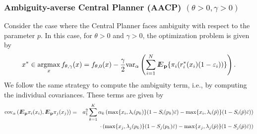 \subsubsection{Ambiguity-averse Central Planner (AACP) $(\theta>0,\gamma>0)$}
Consider the case where the Central Planner faces ambiguity with respect to the parameter $p$.  In this case, for $\theta>0$ and $\gamma>0$, the optimization problem is given by
\begin{equation}\label{eq:aacp}
x^*\in\mathop{\rm argmax}_{x}  f_{\theta,\gamma}(x)= f_{\theta,0}(x) - \frac{\gamma}{2}{\mathop{\rm var}\nolimits}_{\alpha} \left(\sum_{i=1}^N {I\kern-.35em E}_{\bf p}\{\pi_i(r^*_i(x_i)(1-\varepsilon_i))\}\right).
\end{equation}
We follow the same strategy to compute the ambiguity term, i.e., by computing the individual covariances.  These terms are given by 
\begin{eqnarray*}
{\mathop{\rm cov}\nolimits}_\alpha\left({I\kern-.35em E}_{\bf p}\pi_i(x_i),{I\kern-.35em E}_{\bf p}\pi_j(x_j)\right)&=&a_1^2\sum_{k=1}^K \alpha_k \left(\max\{x_i,\lambda_i(p_k)\}(1-S_i(p_k)\bar{\varepsilon}) - \max\{x_i,\lambda_i(\bar{p})\}(1-S_i(\bar{p})\bar{\varepsilon}) \right)\\
&&\quad\quad\cdot\left(\max\{x_j,\lambda_j(p_k)\}(1-S_j(p_k)\bar{\varepsilon}) - \max\{x_j,\lambda_j(\bar{p})\}(1-S_j(\bar{p})\bar{\varepsilon}) \right)\\
\end{eqnarray*} 
